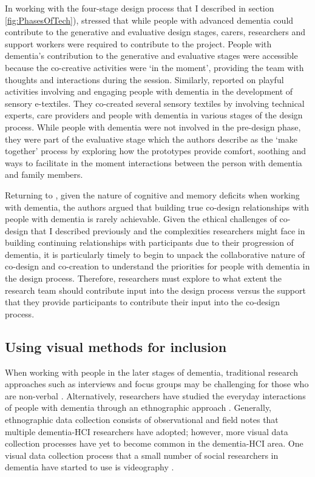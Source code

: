 In working with the four-stage design process that I described in section \ref{fig:PhasesOfTech}), \cite{tsekleves2020engaging} stressed that while people with advanced dementia could contribute to the generative and evaluative design stages, carers, researchers and support workers were required to contribute to the project. People with dementia's contribution to the generative and evaluative stages were accessible because the co-creative activities were `in the moment', providing the team with thoughts and interactions during the session. Similarly, \cite{treadaway_sensor_2016} reported on playful activities involving and engaging people with dementia in the development of sensory e-textiles. They co-created several sensory textiles by involving technical experts, care providers and people with dementia in various stages of the design process. While people with dementia were not involved in the pre-design phase, they were part of the evaluative stage which the authors describe as the `make together' process by exploring how the prototypes provide comfort, soothing and ways to facilitate in the moment interactions between the person with dementia and family members.

Returning to \cite{tsekleves2020engaging}, given the nature of cognitive and memory deficits when working with dementia, the authors argued that building true co-design relationships with people with dementia is rarely achievable. Given the ethical challenges of co-design that I described previously and the complexities researchers might face in building continuing relationships with participants due to their progression of dementia, it is particularly timely to begin to unpack the collaborative nature of co-design and co-creation to understand the priorities for people with dementia in the design process. Therefore, researchers must explore to what extent the research team should contribute input into the design process versus the support that they provide participants to contribute their input into the co-design process.

\subsection{Using visual methods for inclusion}
When working with people in the later stages of dementia, traditional research approaches such as interviews and focus groups may be challenging for those who are non-verbal \citep{swarbrick2015quest}. Alternatively, researchers have studied the everyday interactions of people with dementia through an ethnographic approach \citep{kontos_ethnographic_2004,morrissey_value_2017,foley_care_2019}. Generally, ethnographic data collection consists of observational and field notes that multiple dementia-HCI researchers have adopted; however, more visual data collection processes have yet to become common in the dementia-HCI area. One visual data collection process that a small number of social researchers in dementia have started to use is videography \citep{phillipson2018more}.

